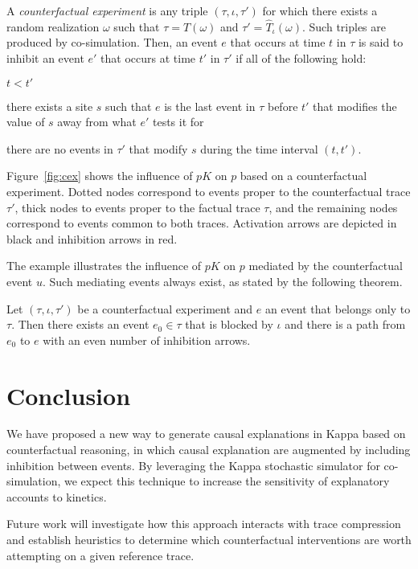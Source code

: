 A \textit{counterfactual experiment} is any triple 
$(\tau, \iota, \tau')$ for which there exists a random realization $\omega$ 
such that $\tau = T(\omega)$ and $\tau' = \hat T_\iota(\omega)$. Such triples are produced by co-simulation. Then, an event $e$ that occurs at time $t$ in $\tau$ is said to inhibit an event $e'$ that occurs at time $t'$ in $\tau'$ if all of the following hold:
\begin{inparaenum}[(i)]
\item $t < t'$
\item there exists a site $s$ such that $e$ is the last event in $\tau$
before $t'$ that modifies the value of $s$ away from what $e'$ tests it for
\item there are no events in $\tau'$ that modify $s$ during the time interval
$(t, t')$.
\end{inparaenum}



Figure~\ref{fig:cex} shows the influence of $pK$ on $p$ based on a counterfactual experiment. Dotted nodes correspond to events proper to the counterfactual trace $\tau'$, thick nodes to events proper to the factual trace $\tau$, and the remaining nodes correspond to events common to both traces. Activation arrows are depicted in black and inhibition arrows in red.

The example illustrates the influence of $pK$ on $p$ mediated by the counterfactual event $u$. Such mediating events always exist, as stated by the following theorem.

\begin{theorem}
Let $(\tau, \iota, \tau')$ be a counterfactual experiment and $e$ an
event that belongs only to $\tau$. Then there exists an event $e_0 \in \tau$ that is blocked by $\iota$ and there is a path from $e_0$ to $e$ with
an even number of inhibition arrows.
\end{theorem}

\section*{Conclusion}

We have proposed a new way to generate causal explanations in Kappa based on counterfactual reasoning, in which causal explanation are augmented by including inhibition between events. By leveraging the Kappa stochastic simulator for co-simulation, we expect this technique to increase the sensitivity of explanatory accounts to kinetics.

Future work will investigate how this approach interacts with trace compression \cite{DBLP:conf/fsttcs/DanosFFHH12} and establish heuristics to determine which counterfactual interventions are worth attempting on a given reference trace.